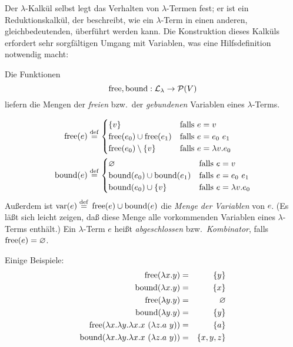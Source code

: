 Der $\lambda$-Kalkül selbst legt das Verhalten von $\lambda$-Termen
fest; er ist ein Reduktionskalkül, der beschreibt, wie ein
$\lambda$-Term in einen anderen, gleichbedeutenden, überführt werden
kann.  Die Konstruktion dieses Kalküls erfordert sehr sorgfältigen
Umgang mit Variablen, was eine Hilfsdefinition notwendig macht:
%
\begin{definition}
  Die Funktionen \[\operatorname{free}, \operatorname{bound} : \mathcal{L}_{\lambda}\rightarrow\mathcal{P}(V)\] liefern
  die Mengen der \emph{freien} bzw.\ der  \emph{gebundenen} Variablen
  eines $\lambda$-Terms.%

  \begin{align*}
    \operatorname{free}(e) & \stackrel{\rm def}{=}
    \begin{cases}
      \{ v \}  & \text{falls } e  = v\\
      \operatorname{free}(e_0) \cup \operatorname{free}(e_1) & \text{falls } e = e_0~e_1\\
      \operatorname{free}(e_0) \setminus \{v\} & \text{falls } e = \lambda v.e_0
    \end{cases}\\
    \operatorname{bound}(e) & \stackrel{\rm def}{=}
    \begin{cases}
      \varnothing & \text{falls } e = v\\
      \operatorname{bound}(e_0) \cup \operatorname{bound}(e_1) & \text{falls } e = e_0~e_1\\
      \operatorname{bound}(e_0) \cup \{v\} & \text{falls } e = \lambda v.e_0
    \end{cases}
  \end{align*}
  Außerdem ist $\operatorname{var}(e) \stackrel{\rm def}{=}{} \operatorname{free}(e)\cup\operatorname{bound}(e)$ die \emph{Menge der
    Variablen} von $e$.  (Es läßt sich leicht zeigen, daß diese Menge
  alle vorkommenden Variablen eines $\lambda$-Terms enthält.)  Ein
  $\lambda$-Term $e$ heißt \emph{abgeschlossen} bzw.\ 
  \textit{Kombinator}, falls $\operatorname{free}(e)=\varnothing$.
\end{definition}
%
Einige Beispiele:
%
\begin{eqnarray*}
  \operatorname{free}(\lambda x.y) &=& \{y\}\\
  \operatorname{bound}(\lambda x.y) &=& \{x\}\\
  \operatorname{free}(\lambda y.y) &=& \varnothing\\
  \operatorname{bound}(\lambda y.y) &=& \{y\}\\
  \operatorname{free}(\lambda x.\lambda y.\lambda x.x~(\lambda z.a~y)) &=& \{ a\}\\
  \operatorname{bound}(\lambda x.\lambda y.\lambda x.x~(\lambda z.a~y)) &=& \{ x,y,z\}
\end{eqnarray*}
